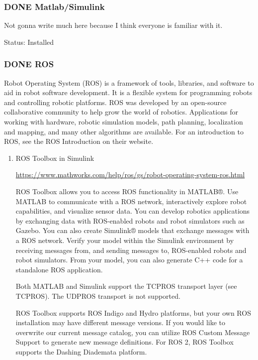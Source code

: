 \documentclass[unrestricted]{meetingnotesminutes}
\begin{document}
\subsubsection{{\bfseries\sffamily DONE} Matlab/Simulink}
\label{sec:org39da8e7}
Not gonna write much here because I think everyone is familiar with it.

Status: Installed

\subsubsection{{\bfseries\sffamily DONE} ROS}
\label{sec:org2dd02e3}
Robot Operating System (ROS) is a framework of tools, libraries, and software to aid in robot software development. It is a flexible system for programming robots and controlling robotic platforms. ROS was developed by an open-source collaborative community to help grow the world of robotics. Applications for working with hardware, robotic simulation models, path planning, localization and mapping, and many other algorithms are available. For an introduction to ROS, see the ROS Introduction on their website.

\begin{enumerate}
\item ROS Toolbox in Simulink
\label{sec:org0dfa587}

\url{https://www.mathworks.com/help/ros/gs/robot-operating-system-ros.html}

ROS Toolbox allows you to access ROS functionality in MATLAB®. Use MATLAB to communicate with a ROS network, interactively explore robot capabilities, and visualize sensor data. You can develop robotics applications by exchanging data with ROS-enabled robots and robot simulators such as Gazebo. You can also create Simulink® models that exchange messages with a ROS network. Verify your model within the Simulink environment by receiving messages from, and sending messages to, ROS-enabled robots and robot simulators. From your model, you can also generate C++ code for a standalone ROS application.

Both MATLAB and Simulink support the TCPROS transport layer (see TCPROS). The UDPROS transport is not supported.

ROS Toolbox supports ROS Indigo and Hydro platforms, but your own ROS installation may have different message versions. If you would like to overwrite our current message catalog, you can utilize ROS Custom Message Support to generate new message definitions. For ROS 2, ROS Toolbox supports the Dashing Diademata platform.
\end{enumerate}
\end{document}
